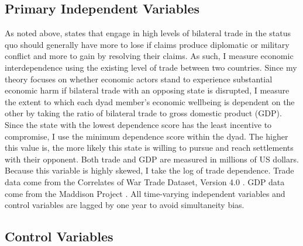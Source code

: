 \subsection{Primary Independent Variables} 

As noted above, states that engage in high levels of bilateral trade in the status quo should generally have more to lose if claims produce diplomatic or military conflict and more to gain by resolving their claims. As such, I measure economic interdependence using the existing level of trade between two countries. Since my theory focuses on whether economic actors stand to experience substantial economic harm if bilateral trade with an opposing state is disrupted, I measure the extent to which each dyad member’s economic wellbeing is dependent on the other by taking the ratio of bilateral trade to gross domestic product (GDP). Since the state with the lowest dependence score has the least incentive to compromise, I use the minimum dependence score within the dyad. The higher this value is, the more likely this state is willing to pursue and reach settlements with their opponent. Both trade and GDP are measured in millions of US dollars. Because this variable is highly skewed, I take the log of trade dependence. Trade data come from the Correlates of War Trade Dataset, Version 4.0 \citep{barbieri2009}. GDP data come from the Maddison Project \citep{bolt2018}. All time-varying independent variables and control variables are lagged by one year to avoid simultaneity bias.



\subsection{Control Variables}




